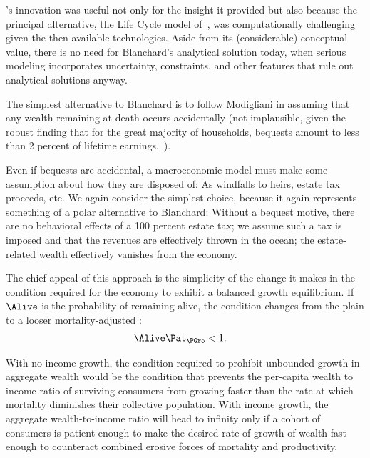 \documentclass[BufferStockTheory]{subfiles}
\begin{document}
\cite{blanchardFinite}'s innovation was useful not only for the insight it provided but also because the principal alternative, the Life Cycle model of~\cite{modiglianiWealth}, was computationally challenging given the then-available technologies. Aside from its (considerable) conceptual value, there is no need for Blanchard's analytical solution today, when serious modeling incorporates uncertainty, constraints, and other features that rule out analytical solutions anyway.%

The simplest alternative to Blanchard is to follow Modigliani in assuming that any wealth remaining at death occurs accidentally (not implausible, given the robust finding that for the great majority of households, bequests amount to less than 2 percent of lifetime earnings,~\cite{hendricksBequests,hendricksSmallBequests}).

Even if bequests are accidental, a macroeconomic model must make some assumption about how they are disposed of: As windfalls to heirs, estate tax proceeds, etc. We again consider the simplest choice, because it again represents something of a polar alternative to Blanchard: Without a bequest motive, there are no behavioral effects of a 100 percent estate tax; we assume such a tax is imposed and that the revenues are effectively thrown in the ocean; the estate-related wealth effectively vanishes from the economy.

The chief appeal of this approach is the simplicity of the change it makes in the condition required for the economy to exhibit a balanced growth equilibrium.  If $\Alive$ is the probability of remaining alive, the condition changes from the plain {\GIC} to a looser mortality-adjusted {\GIC}:
\hypertarget{GICMrt}{}
\begin{align}
  \Alive  \Pat_{\PGro} & < 1. \label{eq:GICMrt}
\end{align}

With no income growth, the condition required to prohibit unbounded growth in aggregate wealth would be the condition that prevents the per-capita wealth to income ratio of surviving consumers from growing faster than the rate at which mortality diminishes their collective population.  With income growth, the aggregate wealth-to-income ratio will head to infinity only if a cohort of consumers is patient enough to make the desired rate of growth of wealth fast enough to counteract combined erosive forces of mortality and productivity.
\end{document}
